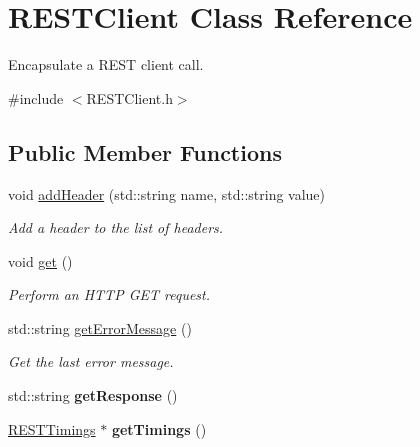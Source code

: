 \hypertarget{class_r_e_s_t_client}{}\section{R\+E\+S\+T\+Client Class Reference}
\label{class_r_e_s_t_client}


Encapsulate a R\+E\+ST client call.  




{\ttfamily \#include $<$R\+E\+S\+T\+Client.\+h$>$}

\subsection*{Public Member Functions}
\begin{DoxyCompactItemize}
\item 
void \hyperlink{class_r_e_s_t_client_a3b60574f73a5beb9fef7253f9bdf35d5}{add\+Header} (std\+::string name, std\+::string value)
\begin{DoxyCompactList}\small\item\em Add a header to the list of headers. \end{DoxyCompactList}\item 
void \hyperlink{class_r_e_s_t_client_ad49cc3c5eae7060f20ab01b673ca798d}{get} ()\hypertarget{class_r_e_s_t_client_ad49cc3c5eae7060f20ab01b673ca798d}{}\label{class_r_e_s_t_client_ad49cc3c5eae7060f20ab01b673ca798d}

\begin{DoxyCompactList}\small\item\em Perform an H\+T\+TP G\+ET request. \end{DoxyCompactList}\item 
std\+::string \hyperlink{class_r_e_s_t_client_ad064323ad773353724ce654c449b0ce5}{get\+Error\+Message} ()\hypertarget{class_r_e_s_t_client_ad064323ad773353724ce654c449b0ce5}{}\label{class_r_e_s_t_client_ad064323ad773353724ce654c449b0ce5}

\begin{DoxyCompactList}\small\item\em Get the last error message. \end{DoxyCompactList}\item 
std\+::string {\bfseries get\+Response} ()\hypertarget{class_r_e_s_t_client_adfad79ecfa8e27972b3fb545a6c04c26}{}\label{class_r_e_s_t_client_adfad79ecfa8e27972b3fb545a6c04c26}

\item 
\hyperlink{class_r_e_s_t_timings}{R\+E\+S\+T\+Timings} $\ast$ {\bfseries get\+Timings} ()\hypertarget{class_r_e_s_t_client_a43e5aafd08ec94a3d338078661a8c48d}{}\label{class_r_e_s_t_client_a43e5aafd08ec94a3d338078661a8c48d}


\end{DoxyCompactItemize}
